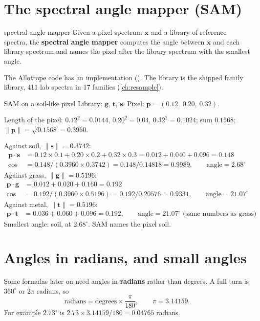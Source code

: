 \documentclass[11pt,a4paper,oneside,openany]{book}
\newcommand{\B}[1]{{\symbf{#1}}}
\newcommand{\B}[1]{{\bm{#1}}}
\newcommand{\nrm}[1]{\lVert #1\rVert}
\newcommand{\vx}{\B{x}}
\newcommand{\vt}{\B{t}}
\newcommand{\vg}{\B{g}}
\newcommand{\vs}{\B{s}}
\newcommand{\vp}{\B{p}}
\begin{document}
\section{The spectral angle mapper (SAM)}

\begin{defn}{spectral angle mapper}
Given a pixel spectrum $\vx$ and a library of reference spectra, the \textbf{spectral angle mapper} computes the angle
between $\vx$ and each library spectrum and names the pixel after the library spectrum with the smallest angle.
\end{defn}

The Allotrope code has an implementation (). The library is the shipped family library,
411 lab spectra in 17 families (\cref{ch:resample}).

\begin{worked}[label=we:sam]{SAM on a soil-like pixel}
Library: $\vg$, $\vt$, $\vs$. Pixel: $\vp=(0.12,\ 0.20,\ 0.32)$.

Length of the pixel: $0.12^2=0.0144$, $0.20^2=0.04$, $0.32^2=0.1024$; sum $0.1568$; $\nrm{\vp}=\sqrt{0.1568}=0.3960$.

Against soil, $\nrm{\vs}=0.3742$:
\begin{align*}
\vp\cdot\vs &= 0.12\times0.1+0.20\times0.2+0.32\times0.3=0.012+0.040+0.096=0.148\\
\cos &= 0.148/(0.3960\times0.3742)=0.148/0.14818=0.9989,\qquad \text{angle}=2.68^\circ
\end{align*}
Against grass, $\nrm{\vg}=0.5196$:
\begin{align*}
\vp\cdot\vg &= 0.012+0.020+0.160=0.192\\
\cos &= 0.192/(0.3960\times0.5196)=0.192/0.20576=0.9331,\qquad \text{angle}=21.07^\circ
\end{align*}
Against metal, $\nrm{\vt}=0.5196$:
\begin{align*}
\vp\cdot\vt &= 0.036+0.060+0.096=0.192,\qquad \text{angle}=21.07^\circ \text{ (same numbers as grass)}
\end{align*}
Smallest angle: soil, at $2.68^\circ$. SAM names the pixel soil.
\end{worked}

\section{Angles in radians, and small angles}

Some formulas later on need angles in \textbf{radians} rather than degrees. A full turn is $360^\circ$ or $2\pi$ radians,
so
\[
  \text{radians}=\text{degrees}\times\frac{\pi}{180},\qquad \pi=3.14159 .
\]
For example $2.73^\circ$ is $2.73\times3.14159/180=0.04765$ radians.
\end{document}
